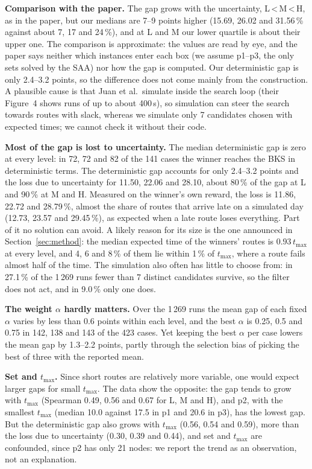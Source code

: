 \documentclass[10pt,a4paper]{article}
\begin{document}
\textbf{Comparison with the paper.} The gap grows with the uncertainty, L\,<\,M\,<\,H, as in the paper,
but our medians are 7--9 points higher (15.69, 26.02 and 31.56\,\% against about 7, 17 and 24\,\%), and
at L and M our lower quartile is about their upper one. The comparison is approximate: the values are
read by eye, and the paper says neither which instances enter each box (we assume p1--p3, the only sets
solved by the SAA) nor how the gap is computed. Our deterministic gap is only 2.4--3.2 points, so the
difference does not come mainly from the construction. A plausible cause is that Juan et al.\ simulate
inside the search loop (their Figure~4 shows runs of up to about 400\,s), so simulation can steer the search towards
routes with slack, whereas we simulate only 7 candidates chosen with expected times; we cannot check it
without their code.

\textbf{Most of the gap is lost to uncertainty.} The median deterministic gap is zero at every
level: in 72, 72 and 82 of the 141 cases the winner reaches the BKS in deterministic terms. The
deterministic gap accounts for only 2.4--3.2 points and the loss due to uncertainty for 11.50, 22.06 and
28.10, about 80\,\% of the gap at L and 90\,\% at M and H. Measured on the winner's own reward, the loss
is 11.86, 22.72 and 28.79\,\%, almost the share of routes that arrive late on a simulated day (12.73, 23.57 and 29.45\,\%), as expected
when a late route loses everything. Part of it no solution can avoid. A likely reason for its size is
the one announced in Section~\ref{sec:method}: the median expected time of the winners' routes is
$0.93\,t_{\max}$ at every level, and 4, 6 and 8\,\% of them lie within 1\,\% of $t_{\max}$, where a route
fails almost half of the time. The simulation also often has little to choose from: in 27.1\,\% of the
1\,269 runs fewer than 7 distinct candidates survive, so the filter does not act, and in 9.0\,\% only one
does.

\textbf{The weight $\alpha$ hardly matters.} Over the 1\,269 runs the mean gap of each fixed $\alpha$
varies by less than 0.6 points within each level, and the best $\alpha$ is 0.25, 0.5 and 0.75 in 142, 138
and 143 of the 423 cases. Yet keeping the best $\alpha$ per case lowers the mean gap by 1.3--2.2 points, partly
through the selection bias of picking the best of three with the reported mean.

\textbf{Set and $t_{\max}$.} Since short routes are relatively more variable, one would expect larger
gaps for small $t_{\max}$. The data show the opposite: the gap tends to grow with $t_{\max}$ (Spearman
0.49, 0.56 and 0.67 for L, M and H), and p2, with the smallest $t_{\max}$ (median 10.0 against 17.5 in p1
and 20.6 in p3), has the lowest gap. But the deterministic gap also grows with $t_{\max}$ (0.56, 0.54 and
0.59), more than the loss due to uncertainty (0.30, 0.39 and 0.44), and set and $t_{\max}$ are
confounded, since p2 has only 21 nodes: we report the trend as an observation, not an explanation.
\end{document}
